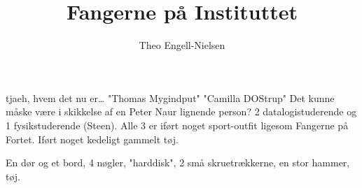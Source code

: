 \documentclass{article}
\begin{document}
\title{Fangerne på Instituttet}

\author{Theo Engell-Nielsen}

\maketitle

\begin {roles}

 tjaeh, hvem det nu er\ldots
{} "Thomas Mygindput"
 "Camilla DOStrup"
 Det kunne måske være i skikkelse af en
Peter Naur lignende person?
 2 datalogistuderende og 1 fysikstuderende (Steen).
Alle 3 er iført noget sport-outfit ligesom Fangerne på Fortet.
Iført noget kedeligt gammelt tøj.

 En dør og et bord, 4 nøgler, "harddisk", 2 små
skruetrækkerne, en stor hammer, tøj.

\end{roles}
\end{document}
